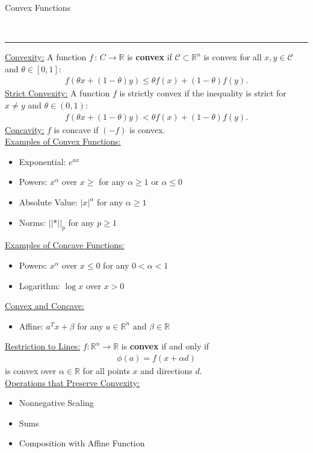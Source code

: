 \documentclass{article}
\newcommand{\header}[1]{\begin{large}\noindent #1\end{large}\\\rule{\textwidth}{0.5pt}}
\newcommand{\norm}[2]{\left\lvert\left\lvert#1\right\rvert\right\rvert}
\newcommand{\sheader}[1]{\underline{#1:}}
\newcommand{\gap}{\medskip\\}
\begin{document}
\header{Convex Functions}
\sheader{Convexity} A function $f\,:\, C \to \mathbb{R}$ is \textbf{convex}
if $\mathcal{C} \subset \mathbb{R}^n$ is convex for all $x, y \in \mathcal{C}$
and $\theta \in [0, 1]$:
\begin{align*}
    f(\theta x + (1- \theta) y)\leq \theta f(x) + (1-\theta)f(y).
\end{align*}
\sheader{Strict Convexity} A function $f$ is strictly convex if the 
inequality is strict for $x \neq y$ and $\theta \in (0, 1)$:
\begin{align*}
    f(\theta x + (1-\theta)y) < \theta f(x) + (1- \theta)f(y).
\end{align*}
\sheader{Concavity} $f$ is concave if $(-f)$ is convex.
\gap
\sheader{Examples of Convex Functions}
\begin{itemize}
    \item Exponential: $e^{ax}$
    \item Powers: $x^\alpha$ over $x\geq $ for any $\alpha \geq 1$ or $\alpha \leq 0$
    \item Absolute Value: $|x|^\alpha$ for any $\alpha \geq 1$
    \item Norms: $\norm*{x}_p$ for any $p \geq 1$
\end{itemize}
\sheader{Examples of Concave Functions}
\begin{itemize}
    \item Powers: $x^\alpha$ over $x\leq 0$ for any $0 < \alpha < 1$
    \item Logarithm: $\log x$ over $x>0$
\end{itemize}
\sheader{Convex and Concave}
\begin{itemize}
    \item Affine: $a^Tx + \beta$ for any $a \in \mathbb{R}^n$ and $\beta \in\mathbb{R}$
\end{itemize}

\sheader{Restriction to Lines} $f : \mathbb{R}^n \to \mathbb{R}$ is 
\textbf{convex} if and only if 
\begin{align*}
    \phi(a) = f(x + \alpha d)
\end{align*}
is convex over $\alpha \in \mathbb{R}$ for all points $x$ and 
directions $d$.
\gap
\sheader{Operations that Preserve Convexity}
\begin{itemize}
    \item Nonnegative Scaling
    \item Sums
    \item Composition with Affine Function
\end{itemize}
\end{document}
